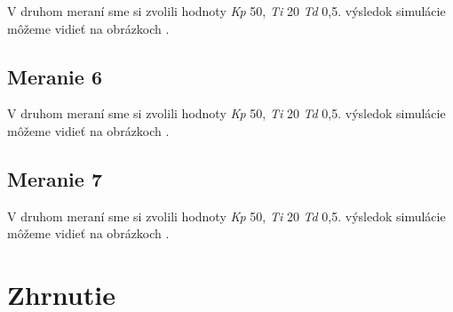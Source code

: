 \documentclass{article}
\begin{document}
V druhom meraní sme si zvolili hodnoty \textit{Kp} 50, \textit{Ti} 20 \textit{Td} 0,5. výsledok simulácie môžeme vidieť na obrázkoch  .


\clearpage

\subsection{Meranie 6}
\label{sec:meranie6}

V druhom meraní sme si zvolili hodnoty \textit{Kp} 50, \textit{Ti} 20 \textit{Td} 0,5. výsledok simulácie môžeme vidieť na obrázkoch  .


\clearpage

\subsection{Meranie 7}
\label{sec:meranie7}

V druhom meraní sme si zvolili hodnoty \textit{Kp} 50, \textit{Ti} 20 \textit{Td} 0,5. výsledok simulácie môžeme vidieť na obrázkoch  .


\clearpage

\section{Zhrnutie}
\label{sec:zhrnutie}

\end{document}
